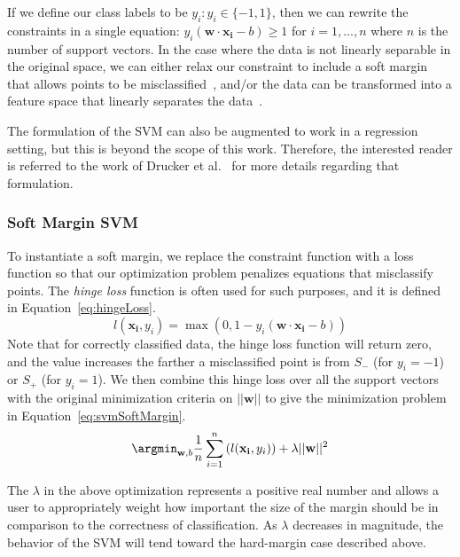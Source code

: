 If we define our class labels to be $y_i: y_i \in \{-1,1\}$, then we can rewrite the constraints in a single equation: $y_i(\mathbf{w} \cdot \mathbf{x_i} - b ) \geq 1$ for $i=1,...,n$ where $n$ is the number of support vectors.
%
In the case where the data is not linearly separable in the original space, we can either relax our constraint to include a soft margin that allows points to be misclassified~\cite{CortesVapnik1995}, and/or the data can be transformed into a feature space that linearly separates the data~\cite{BoserGuyonVapnik1992}.

The formulation of the SVM can also be augmented to work in a regression setting, but this is beyond the scope of this work.
%
Therefore, the interested reader is referred to the work of Drucker et al.~\cite{DruckerBurgesKaufman1997} for more details regarding that formulation.

\subsubsection{Soft Margin SVM}

To instantiate a soft margin, we replace the constraint function with a loss function so that our optimization problem penalizes equations that misclassify points.
%
The \emph{hinge loss} function is often used for such purposes, and it is defined in Equation~\ref{eq:hingeLoss}.
%
\begin{equation}
l(\mathbf{x_i},y_i) = \max(0,1-y_i(\mathbf{w} \cdot \mathbf{x_i} - b))
\label{eq:hingeLoss}
\end{equation}
%
Note that for correctly classified data, the hinge loss function will return zero, and the value increases the farther a misclassified point is from $S_-$ (for $y_i=-1$) or $S_+$ (for $y_i=1$).
%
We then combine this hinge loss over all the support vectors with the original minimization criteria on $||\mathbf{w}||$ to give the minimization problem in Equation~\ref{eq:svmSoftMargin}.
\begin{equation}
\argmin_{\mathbf{w},b}\frac{1}{n}\sum_{i=1}^n \left(l(\mathbf{x_i},y_i)\right) + \lambda ||\mathbf{w}||^2
\label{eq:svmSoftMargin}
\end{equation}

The $\lambda$ in the above optimization represents a positive real number and allows a user to appropriately weight how important the size of the margin should be in comparison to the correctness of classification.
%
As $\lambda$ decreases in magnitude, the behavior of the SVM will tend toward the hard-margin case described above.

